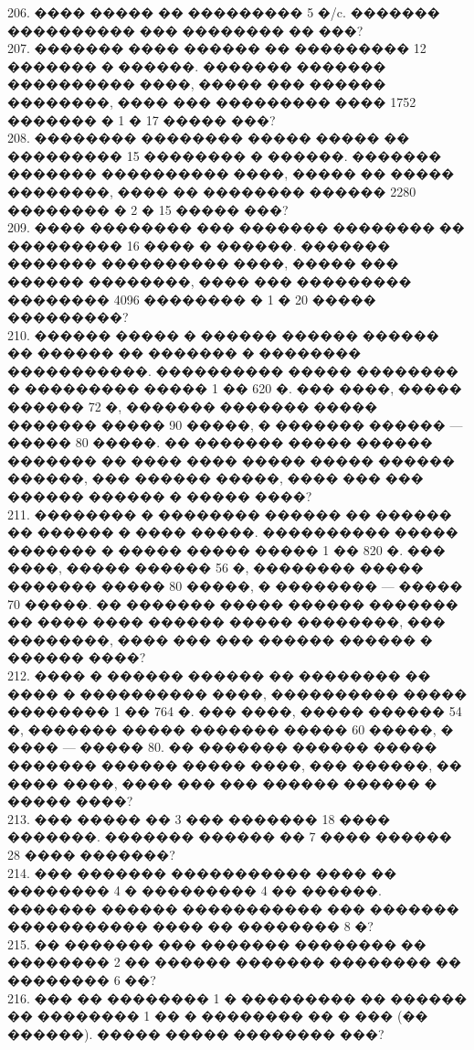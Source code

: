 \documentclass[12pt]{article}
\begin{document}
206. ���� ����� �� ��������� 5 �/c. ������� ���������� ��� �������� �� ���?\\
207. ������� ���� ������ �� ��������� 12 ������� � ������. ������� ������� ���������� ����, ����� ��� ������ ��������, ���� ��� ��������� ���� 1752 ������� � 1 � 17 ����� ���?\\
208. �������� �������� ����� ����� �� ��������� 15 �������� � ������. ������� ������� ���������� ����, ����� �� ����� ��������, ���� �� �������� ������ 2280 �������� � 2 � 15 ����� ���?\\
209. ���� �������� ��� ������� �������� �� ��������� 16 ���� � ������. ������� ������� ���������� ����, ����� ��� ������ ��������, ���� ��� ��������� �������� 4096 �������� � 1 � 20 ����� ���������?\\
210. ������ ����� � ������ ������ ������ �� ������ �� ������� � �������� �����������. ���������� ����� �������� � ��������� ����� 1 �� 620 �. ��� ����, ����� ������ 72 �, ������� ������� ����� ������� ����� 90 �����, � ������� ������ --- ����� 80 �����. �� ������� ����� ������ ������� �� ���� ���� ����� ����� ������ ������, ��� ������ �����, ���� ��� ��� ������ ������ � ����� ����?\\
211. �������� � �������� ������ �� ������ �� ������ � ���� �����. ���������� ����� ������� � ����� ����� ����� 1 �� 820 �. ��� ����, ����� ������ 56 �, �������� ����� ������� ����� 80 �����, � �������� --- ����� 70 �����. �� ������� ����� ������ ������� �� ���� ���� ������ ����� ��������, ��� ��������, ���� ��� ��� ������ ������ � ������ ����?\\
212. ���� � ������ ������ �� �������� �� ���� � ���������� ����, ���������� ����� �������� 1 �� 764 �. ��� ����, ����� ������ 54 �, ������� ����� ������� ����� 60 �����, � ���� --- ����� 80. �� ������� ������ ����� ������� ������ ����� ����, ��� ������, �� ���� ����, ���� ��� ��� ������ ������ � ����� ����?\\
213. ��� ����� �� 3 ��� ������� 18 ���� �������. ������� ������ �� 7 ���� ������ 28 ���� �������?\\
214. ��� ������� ����������� ���� �� �������� 4 � ��������� 4 �� ������. ������� ������ ����������� ��� ������� ����������� ���� �� �������� 8 �?\\
215. �� ������� ��� ������� �������� �� �������� 2 �� ������ ������� �������� �� �������� 6 ��?\\
216. ��� �� �������� 1 � ��������� �� ������ �� �������� 1 �� � �������� �� � ��� (�� ������). ����� ����� �������� ���?\\
\end{document}
